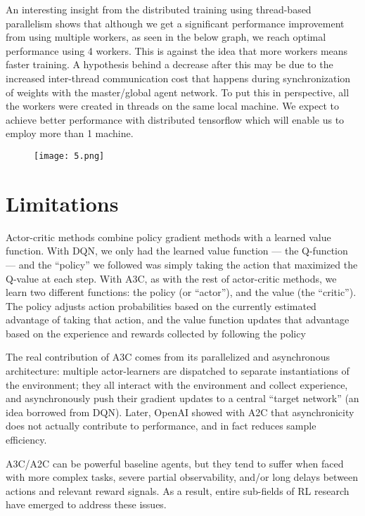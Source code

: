 \documentclass[conference]{IEEEtran}
\begin{document}
An interesting insight from the distributed training using thread-based parallelism shows that although we get a significant performance improvement from using multiple workers, as seen in the below graph, we reach optimal performance using 4 workers. This is against the idea that more workers means faster training. A hypothesis behind a decrease after this may be due to the increased inter-thread communication cost that happens during synchronization of weights with the master/global agent network. To put this in perspective, all the workers were created in threads on the same local machine. We expect to achieve better performance with distributed tensorflow which will enable us to employ more than 1 machine.

\begin{figure}[htp]
    \centering
    \texttt{[image: 5.png]}
\end{figure}

\section{Limitations}

Actor-critic methods combine policy gradient methods with a learned value function. With DQN, we only had the learned value function — the Q-function — and the “policy” we followed was simply taking the action that maximized the Q-value at each step. With A3C, as with the rest of actor-critic methods, we learn two different functions: the policy (or “actor”), and the value (the “critic”). The policy adjusts action probabilities based on the currently estimated advantage of taking that action, and the value function updates that advantage based on the experience and rewards collected by following the policy

The real contribution of A3C comes from its parallelized and asynchronous architecture: multiple actor-learners are dispatched to separate instantiations of the environment; they all interact with the environment and collect experience, and asynchronously push their gradient updates to a central “target network” (an idea borrowed from DQN). Later, OpenAI showed with A2C that asynchronicity does not actually contribute to performance, and in fact reduces sample efficiency.

A3C/A2C can be powerful baseline agents, but they tend to suffer when faced with more complex tasks, severe partial observability, and/or long delays between actions and relevant reward signals. As a result, entire sub-fields of RL research have emerged to address these issues.
\end{document}
